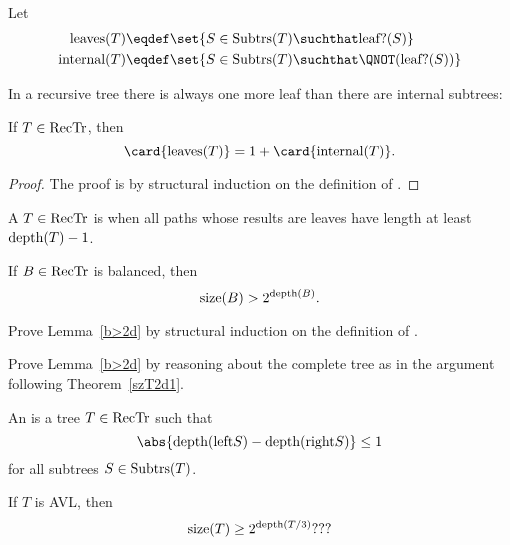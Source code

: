 Let
\begin{align*}
\text{leaves}(T)   & \eqdef \set{S \in \subbrn{T} \suchthat \leafp{(S)}}\\
\text{internal}(T) & \eqdef \set{S \in \subbrn{T} \suchthat \QNOT(\leafp{(S)})}\\
\end{align*}

In a recursive tree there is always one more leaf than there are
internal subtrees:

\begin{lemma}\label{}
If $T \in \text{RecTr}$, then
\[
\card{\text{leaves}(T)} = 1 + \card{\text{internal}(T)}.
\]
\end{lemma}

\begin{proof}
The proof is by structural induction on the definition of \rectr.

\end{proof} 

A $T \in \text{RecTr}$ is  when all paths whose
results are leaves have length at least $\text{depth}(T) -1$.

\begin{lemma}\label{b>2d}
If $B \in \text{RecTr}$ is balanced, then
\[
\text{size}(B) > 2^{\text{depth}(B)}.
\]
\end{lemma}

\begin{problem}
Prove Lemma~\ref{b>2d} by structural induction on the definition of \rectr.

\begin{solution}
\end{solution}
\end{problem}

\begin{problem}
Prove Lemma~\ref{b>2d} by reasoning about the complete tree as in the
argument following Theorem~\ref{szT2d1}.

\begin{solution}
\end{solution}
\end{problem}

An  is a tree $T\in \text{RecTr}$ such that
\[
\abs{\trdpth{\leftsub{S}} - \trdpth{\rightsub{S}}} \leq 1
\]
for all subtrees $S \in \text{Subtrs}(T)$.

\begin{lemma}\label{}
If $T$ is AVL, then
\[
\text{size}(T) \geq 2^{\text{depth}(T/3)}???
\]
\end{lemma}

